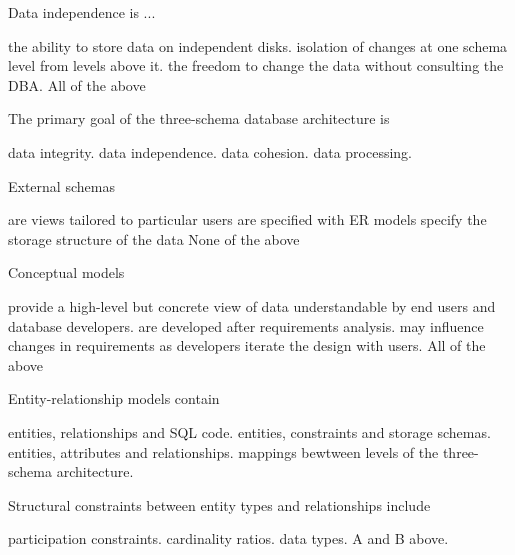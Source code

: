 \documentclass[9pt]{exam}
\begin{document}
\begin{questions}
\question[4] Data independence is ...

\begin{choices}
\choice the ability to store data on independent disks.
\correctchoice isolation of changes at one schema level from levels above it.
\choice the freedom to change the data without consulting the DBA.
\choice All of the above
\end{choices}

\newpage

\question[4] The primary goal of the three-schema database architecture is

\begin{choices}
\choice data integrity.
\correctchoice data independence.
\choice data cohesion.
\choice data processing.
\end{choices}

\question[4] External schemas

\begin{choices}
\correctchoice are views tailored to particular users
\choice are specified with ER models
\choice specify the storage structure of the data
\choice None of the above
\end{choices}

\question[4] Conceptual models

\begin{choices}
\choice provide a high-level but concrete view of data understandable by end users and database developers.
\choice are developed after requirements analysis.
\choice may influence changes in requirements as developers iterate the design with users.
\correctchoice All of the above
\end{choices}

\question[4] Entity-relationship models contain

\begin{choices}
\choice entities, relationships and SQL code.
\choice entities, constraints and storage schemas.
\correctchoice entities, attributes and relationships.
\choice mappings bewtween levels of the three-schema architecture.
\end{choices}

\question[4] Structural constraints between entity types and relationships include

\begin{choices}
\choice participation constraints.
\choice cardinality ratios.
\choice data types.
\correctchoice A and B above.
\end{choices}


\end{questions}
\end{document}
